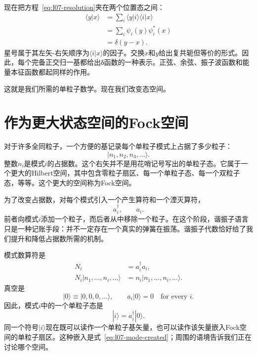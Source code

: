 现在把方程~\eqref{eq:l07-resolution}夹在两个位置态之间：
\begin{align}
\langle y|x\rangle
&=\sum_i\langle y|i\rangle\langle i|x\rangle \\
&=\sum_i\psi_i(y)\psi_i^*(x) \\
&=\delta(y-x).
\label{eq:l07-position-completeness}
\end{align}
星号属于其左矢-右矢顺序为\(\langle i|x\rangle\)的因子。交换\(x\)和\(y\)给出复共轭但等价的形式。因此，每个完备正交归一基都给出{\proseunicodefont δ}函数的一种表示。正弦、余弦、振子波函数和能量本征函数都起同样的作用。

\begin{classroomqa}
\end{classroomqa}

这就是我们所需的单粒子数学。现在我们改变态空间。

\section{作为更大状态空间的Fock空间}

对于许多全同粒子，一个方便的基记录每个单粒子模式上占据了多少粒子：
\begin{equation}
|n_1,n_2,n_3,\ldots\rangle.
\label{eq:l07-fock-basis}
\end{equation}
整数\(n_i\)是模式\(i\)的占据数。这个右矢并不是用花哨记号写出的单粒子态。它属于一个更大的Hilbert空间，其中包含零粒子扇区、每一个单粒子态、每一个双粒子态，等等。这个更大的空间称为Fock空间。

为了改变占据数，对每个模式引入一个产生算符和一个湮灭算符，
\begin{equation}
a_i^\dagger,\qquad a_i.
\end{equation}
前者向模式\(i\)添加一个粒子，而后者从中移除一个粒子。在这个阶段，谐振子语言只是一种记账手段：并不一定存在一个真实的弹簧在振荡。谐振子代数恰好给了我们提升和降低占据数所需的机制。

模式数算符是
\begin{equation}
\begin{aligned}
N_i&=a_i^\dagger a_i,\\
N_i|n_1,\ldots,n_i,\ldots\rangle
&=n_i|n_1,\ldots,n_i,\ldots\rangle.
\end{aligned}
\end{equation}
真空是
\begin{equation}
|0\rangle\equiv|0,0,0,\ldots\rangle,
\qquad
a_i|0\rangle=0
\quad\text{for every }i.
\label{eq:l07-vacuum}
\end{equation}
因此，模式\(i\)中的一个单粒子态是
\begin{equation}
|i\rangle=a_i^\dagger|0\rangle.
\label{eq:l07-mode-created}
\end{equation}
同一个符号\(|i\rangle\)现在既可以读作一个单粒子基矢量，也可以读作该矢量嵌入Fock空间的单粒子扇区。这种嵌入是式~\eqref{eq:l07-mode-created}；周围的语境告诉我们正在讨论哪个空间。

